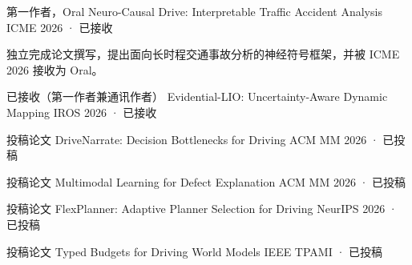 
\begin{cventries}

  \cventry
    {第一作者，Oral}
    {Neuro-Causal Drive: Interpretable Traffic Accident Analysis}
    {}
    {ICME 2026 · 已接收}
    {
      \begin{cvitems}
        \item {独立完成论文撰写，提出面向长时程交通事故分析的神经符号框架，并被 ICME 2026 接收为 Oral。}
      \end{cvitems}
    }

  \cventry
    {已接收（第一作者兼通讯作者）}
    {Evidential-LIO: Uncertainty-Aware Dynamic Mapping}
    {}
    {IROS 2026 · 已接收}
    {}

  \cventry
    {投稿论文}
    {DriveNarrate: Decision Bottlenecks for Driving}
    {}
    {ACM MM 2026 · 已投稿}
    {}

  \cventry
    {投稿论文}
    {Multimodal Learning for Defect Explanation}
    {}
    {ACM MM 2026 · 已投稿}
    {}

  \cventry
    {投稿论文}
    {FlexPlanner: Adaptive Planner Selection for Driving}
    {}
    {NeurIPS 2026 · 已投稿}
    {}

  \cventry
    {投稿论文}
    {Typed Budgets for Driving World Models}
    {}
    {IEEE TPAMI · 已投稿}
    {}

\end{cventries}
